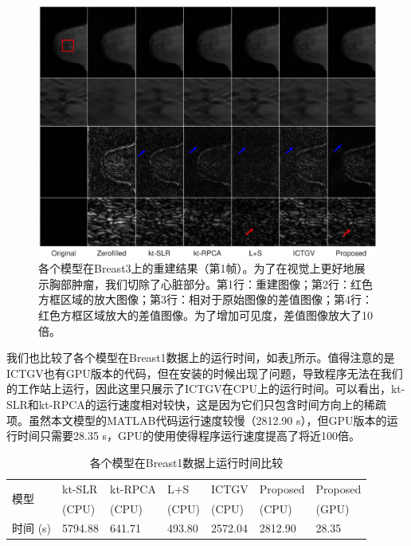 \begin{figure}
\centering
\includegraphics[width=1\textwidth]{img/tgvnn/breast3.eps}
\caption{各个模型在Breast3上的重建结果（第1帧）。为了在视觉上更好地展示胸部肿瘤，我们切除了心脏部分。第1行：重建图像；第2行：红色方框区域的放大图像；第3行：相对于原始图像的差值图像；第4行：红色方框区域放大的差值图像。为了增加可见度，差值图像放大了10倍。}
\label{fig:breast3}
\end{figure} 

我们也比较了各个模型在Breast1数据上的运行时间，如表\ref{tab:time3}所示。值得注意的是ICTGV也有GPU版本的代码，但在安装的时候出现了问题，导致程序无法在我们的工作站上运行，因此这里只展示了ICTGV在CPU上的运行时间。可以看出，kt-SLR和kt-RPCA的运行速度相对较快，这是因为它们只包含时间方向上的稀疏项。虽然本文模型的MATLAB代码运行速度较慢（2812.90 s），但GPU版本的运行时间只需要28.35 s，GPU的使用使得程序运行速度提高了将近100倍。
\begin{table}
\centering
\caption{各个模型在Breast1数据上运行时间比较}
\begin{center}
\begin{tabular}{|l|l|l|l|l|l|l|}
\hline
\hline
\multirow{2}{*}{模型} & kt-SLR & kt-RPCA & L+S & ICTGV & Proposed & Proposed \\
& (CPU) & (CPU) & (CPU) & (CPU) & (CPU) & (GPU) \\
\hline
时间 (s) & 5794.88 & 641.71 & 493.80 & 2572.04 & 2812.90 & 28.35 \\
\hline
\end{tabular}
\end{center}
\label{tab:time3}
\end{table}

